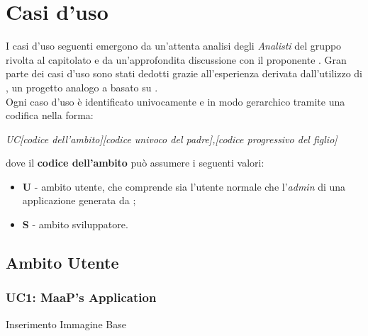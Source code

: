 \section{Casi d'uso}
I casi d'uso seguenti emergono da un'attenta analisi degli \textit{Analisti} del gruppo \GroupName{} rivolta al capitolato e da un'approfondita discussione con il proponente \Proponente{}. Gran parte dei casi d'uso sono stati dedotti grazie all'esperienza derivata dall'utilizzo di , un progetto analogo a \ProjectName{} basato su .\\
Ogni caso d'uso è identificato univocamente e in modo gerarchico tramite una codifica nella forma:

\begin{center}

\textit{UC[codice dell'ambito][codice univoco del padre],[codice progressivo del figlio]}

\end{center} 

dove il \textbf{codice dell'ambito} può assumere i seguenti valori:

\begin{itemize}

	\item \textbf{U} - ambito utente, che comprende sia l'utente normale che l'\textit{admin} di una applicazione generata da \ProjectName{};
	\item \textbf{S} - ambito sviluppatore.

\end{itemize}

\subsection{Ambito Utente}

\subsubsection{UC1: MaaP's Application}
		
Inserimento Immagine Base
			
